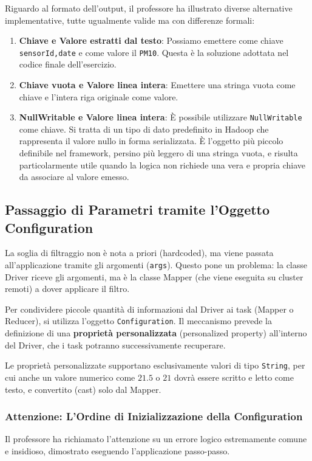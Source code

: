 Riguardo al formato dell'output, il professore ha illustrato diverse alternative implementative, tutte ugualmente valide ma con differenze formali:
\begin{enumerate}
    \item \textbf{Chiave e Valore estratti dal testo}: Possiamo emettere come chiave \texttt{sensorId,date} e come valore il \texttt{PM10}. Questa è la soluzione adottata nel codice finale dell'esercizio.
    \item \textbf{Chiave vuota e Valore linea intera}: Emettere una stringa vuota come chiave e l'intera riga originale come valore.
    \item \textbf{NullWritable e Valore linea intera}: È possibile utilizzare \texttt{NullWritable} come chiave. Si tratta di un tipo di dato predefinito in Hadoop che rappresenta il valore nullo in forma serializzata. È l'oggetto più piccolo definibile nel framework, persino più leggero di una stringa vuota, e risulta particolarmente utile quando la logica non richiede una vera e propria chiave da associare al valore emesso.
\end{enumerate}

\subsection{Passaggio di Parametri tramite l'Oggetto Configuration}
La soglia di filtraggio non è nota a priori (hardcoded), ma viene passata all'applicazione tramite gli argomenti (\texttt{args}). Questo pone un problema: la classe Driver riceve gli argomenti, ma è la classe Mapper (che viene eseguita su cluster remoti) a dover applicare il filtro.

Per condividere piccole quantità di informazioni dal Driver ai task (Mapper o Reducer), si utilizza l'oggetto \texttt{Configuration}. Il meccanismo prevede la definizione di una \textbf{proprietà personalizzata} (personalized property) all'interno del Driver, che i task potranno successivamente recuperare.

Le proprietà personalizzate supportano esclusivamente valori di tipo \texttt{String}, per cui anche un valore numerico come $21.5$ o $21$ dovrà essere scritto e letto come testo, e convertito (cast) solo dal Mapper.

\subsubsection{Attenzione: L'Ordine di Inizializzazione della Configuration}
Il professore ha richiamato l'attenzione su un errore logico estremamente comune e insidioso, dimostrato eseguendo l'applicazione passo-passo.

